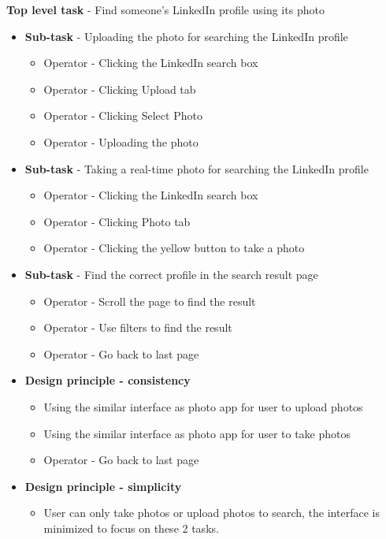 \documentclass[
	letterpaper, %
]{jdf}
\begin{document}
\textbf{Top level task} - Find someone's LinkedIn profile using its photo
\begin{itemize}
    \item \textbf{Sub-task} - Uploading the photo for searching the LinkedIn profile
        \begin{itemize}
            \item Operator - Clicking the LinkedIn search box
            \item Operator - Clicking Upload tab
            \item Operator - Clicking Select Photo
            \item Operator - Uploading the photo
        \end{itemize}
    \item \textbf{Sub-task} - Taking a real-time photo for searching the LinkedIn profile
        \begin{itemize}
            \item Operator - Clicking the LinkedIn search box
            \item Operator - Clicking Photo tab
            \item Operator - Clicking the yellow button to take a photo 
        \end{itemize}
    \item \textbf{Sub-task} - Find the correct profile in the search result page
        \begin{itemize}
            \item Operator - Scroll the page to find the result
            \item Operator - Use filters to find the result
            \item Operator - Go back to last page
        \end{itemize}
    \item \textbf{Design principle - consistency}
        \begin{itemize}
            \item Using the similar interface as photo app for user to upload photos
            \item Using the similar interface as photo app for user to take photos
            \item Operator - Go back to last page
        \end{itemize}
    \item \textbf{Design principle - simplicity}
        \begin{itemize}
            \item User can only take photos or upload photos to search, the interface is minimized to focus on these 2 tasks.

\end{itemize}
\end{itemize}
\end{document}
